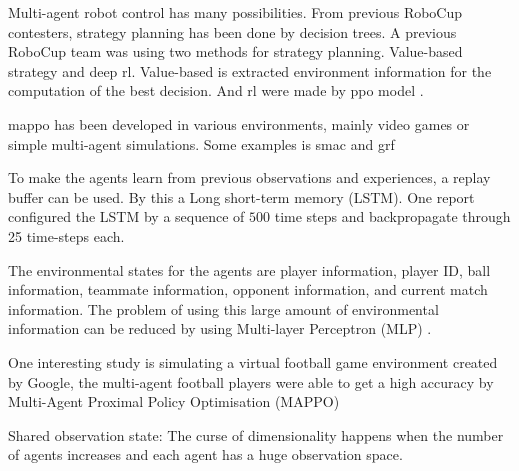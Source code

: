 Multi-agent robot control has many possibilities. From previous RoboCup contesters, strategy planning has been done by decision trees.  A previous RoboCup team was using two methods for strategy planning. Value-based strategy and deep \ac{rl}. Value-based is extracted environment information for the computation of the best decision. And \ac{rl} were made by \ac{ppo} model \cite{huang_zjunlict_2023}. 

\ac{mappo} has been developed in various environments, mainly video games or simple multi-agent simulations. Some examples is \ac{smac} and \ac{grf} \cite{yu_surprising_2022}

To make the agents learn from previous observations and experiences, a replay buffer can be used. By this a Long short-term memory (LSTM). One report configured the LSTM by a sequence of $500$ time steps and backpropagate through 25 time-steps each\cite{lin_tizero_2023}. 

The environmental states for the agents are player information, player ID, ball information, teammate information, opponent
information, and current match information. The problem of using this large amount of environmental information can be reduced by using Multi-layer Perceptron (MLP) \cite{lin_tizero_2023}.



One interesting study is simulating a virtual football game environment created by Google, the multi-agent football players were able to get a high accuracy by Multi-Agent Proximal Policy Optimisation (MAPPO)\cite{yu_surprising_2022} %

Shared observation state:
The curse of dimensionality happens when the number of agents increases and each agent has a huge observation space.



